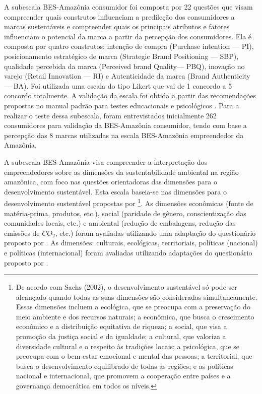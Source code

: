 A subescala BES-Amazônia consumidor foi composta por 22 questões que visam compreender quais construtos influenciam a predileção dos consumidores a marcas sustentáveis e compreender quais os principais atributos e fatores influenciam o potencial da marca a partir da percepção dos consumidores. Ela é composta por quatro construtos: intenção de compra (Purchase intention — PI), posicionamento estratégico de marca (Strategic Brand Positioning — SBP), qualidade percebida da marca (Perceived brand Quality— PBQ), inovação no varejo (Retail Innovation — RI) e Autenticidade da marca (Brand Authenticity — BA). Foi utilizada uma escala do tipo Likert que vai de 1 concordo a 5 concordo totalmente. A validação da escala foi obtida a partir das recomendações propostas no manual padrão para testes educacionais e psicológicos \cite{Association2018}. Para a realizar o teste dessa subescala, foram entrevistados inicialmente 262 consumidores para validação da BES-Amazônia consumidor, tendo com base a percepção das 8 marcas utilizadas na escala BES-Amazônia empreendedor da Amazônia. 

A subescala BES-Amazônia visa compreender a interpretação dos empreendedores sobre as dimensões da sustentabilidade ambiental na região amazônica, com foco nas questões orientadoras das dimensões para o desenvolvimento sustentável. Esta escala baseia-se nas dimensões para o desenvolvimento sustentável propostas por \footnote{De acordo com Sachs (2002), o desenvolvimento sustentável só pode ser alcançado quando todas as suas dimensões são consideradas simultaneamente. Essas dimensões incluem a ecológica, que se preocupa com a preservação do meio ambiente e dos recursos naturais; a econômica, que busca o crescimento econômico e a distribuição equitativa de riqueza; a social, que visa a promoção da justiça social e da igualdade; a cultural, que valoriza a diversidade cultural e o respeito às tradições locais; a psicológica, que se preocupa com o bem-estar emocional e mental das pessoas; a territorial, que busca o desenvolvimento equilibrado de todas as regiões; e as políticas nacional e internacional, que promovem a cooperação entre países e a governança democrática em todos os níveis.}. As dimensões econômicas (fonte de matéria-prima, produtos, etc.), social (paridade de gênero, conscientização das comunidades locais, etc.) e ambiental (redução de embalagens, redução das emissões de $CO_2$, etc.) foram avaliadas utilizando uma adaptação do questionário proposto por . As dimensões: culturais, ecológicas, territoriais, políticas (nacional) e políticas (internacional) foram avaliadas utilizando adaptações do questionário proposto por . 

